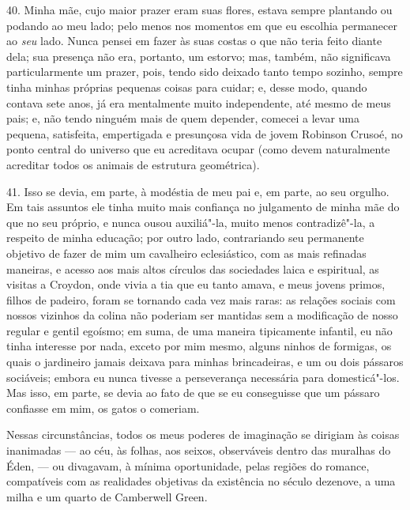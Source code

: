 40. Minha mãe, cujo maior prazer eram suas flores, estava sempre
plantando ou podando ao meu lado; pelo menos nos momentos em que eu
escolhia permanecer ao \emph{seu} lado. Nunca pensei em fazer às suas
costas o que não teria feito diante dela; sua presença não era,
portanto, um estorvo; mas, também, não significava particularmente um
prazer, pois, tendo sido deixado tanto tempo sozinho, sempre tinha
minhas próprias pequenas coisas para cuidar; e, desse modo, quando
contava sete anos, já era mentalmente muito independente, até mesmo de
meus pais; e, não tendo ninguém mais de quem depender, comecei a levar
uma pequena, satisfeita, empertigada e presunçosa vida de jovem Robinson
Crusoé, no ponto central do universo que eu acreditava ocupar (como
devem naturalmente acreditar todos os animais de estrutura geométrica).

41. Isso se devia, em parte, à modéstia de meu pai e, em parte, ao seu
orgulho. Em tais assuntos ele tinha muito mais confiança no julgamento
de minha mãe do que no seu próprio, e nunca ousou auxiliá"-la, muito
menos contradizê"-la, a respeito de minha educação; por outro lado,
contrariando seu permanente objetivo de fazer de mim um cavalheiro
eclesiástico, com as mais refinadas maneiras, e acesso aos mais altos
círculos das sociedades laica e espiritual, as visitas a Croydon, onde
vivia a tia que eu tanto amava, e meus jovens primos, filhos de padeiro,
foram se tornando cada vez mais raras: as relações sociais com nossos
vizinhos da colina não poderiam ser mantidas sem a modificação de nosso
regular e gentil egoísmo; em suma, de uma maneira tipicamente infantil,
eu não tinha interesse por nada, exceto por mim mesmo, alguns ninhos de
formigas, os quais o jardineiro jamais deixava para minhas brincadeiras,
e um ou dois pássaros sociáveis; embora eu nunca tivesse a perseverança
necessária para domesticá"-los. Mas isso, em parte, se devia ao fato de
que se eu conseguisse que um pássaro confiasse em mim, os gatos o
comeriam.

Nessas circunstâncias, todos os meus poderes de imaginação se dirigiam
às coisas inanimadas --- ao céu, às folhas, aos seixos, observáveis
dentro das muralhas do Éden, --- ou divagavam, à mínima oportunidade,
pelas regiões do romance, compatíveis com as realidades objetivas da
existência no século dezenove, a uma milha e um quarto de Camberwell
Green.

